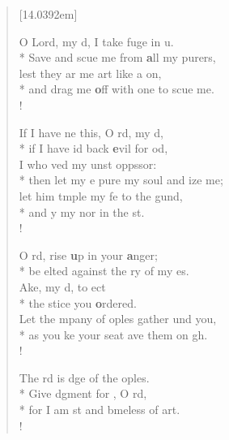 \begin{flushleft}
\begin{verse}[14.0392em]

 O Lord, my d, I take fuge in u.\\*
Save and scue me from \textbf{a}ll my purers,\\
 lest they ar me art like a on,\\*
and drag me \textbf{o}ff with  one to scue me.\\!

 If I have ne this, O rd, my d,\\*
 if I have id back \textbf{e}vil for od,\\
I who ved my unst oppssor:\\*
 then let my e pure my soul and ize me;\\
let him tmple my fe to the gund,\\*
and y my nor in the st.\\!

 O rd, rise \textbf{u}p in your \textbf{a}nger;\\*
be elted against the ry of my es.\\
Ake, my d, to ect\\*
the stice you \textbf{o}rdered.\\
 Let the mpany of oples gather und you,\\*
as you ke your seat ave them on gh.\\!

 The rd is dge of the oples.\flagflex{\dag}\\*
Give dgment for , O rd,\\*
for I am st and bmeless of art.\\!


\end{verse}
\end{flushleft}
